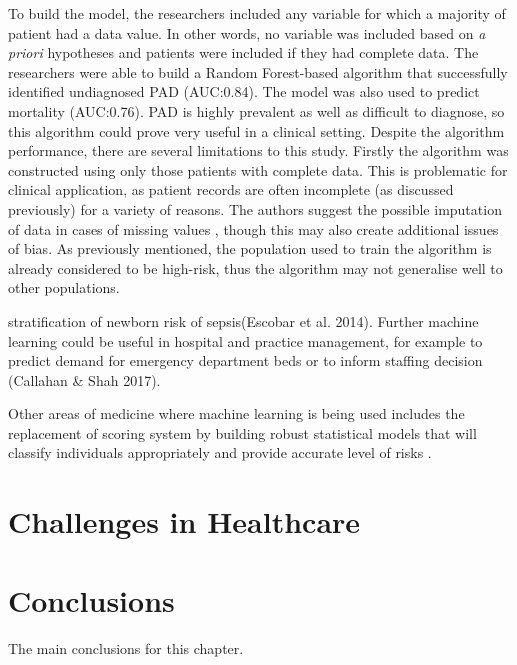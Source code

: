  To build the model, the researchers included any variable for which a majority of patient had a data value. In other words, no variable was included based on \textit{a priori} hypotheses and patients were included if they had complete data. The researchers were able to build a Random Forest-based algorithm that successfully identified undiagnosed PAD (AUC:0.84). The model was also used to predict mortality (AUC:0.76). PAD is highly prevalent as well as difficult to diagnose, so this algorithm could prove very useful in a clinical setting.\newline
 Despite the algorithm performance, there are several limitations to this study. Firstly the algorithm was constructed using only those patients with complete data. This is problematic for clinical application, as patient records are often incomplete (as discussed previously) for a variety of reasons. The authors suggest the possible imputation of data in cases of missing values \citep{Ross:2016kh}, though this may also create additional issues of bias. As previously mentioned, the population used to train the algorithm is already considered  to be high-risk, thus the algorithm may not generalise well to other populations.

 stratification of newborn risk of sepsis(Escobar et al. 2014). Further machine learning could be useful in hospital and practice management, for example to predict demand for emergency department beds or to inform staffing decision (Callahan & Shah 2017).


Other areas of medicine where machine learning is being used includes the replacement of scoring system by building robust statistical models that will classify individuals appropriately and provide accurate level of risks \citep{Callahan:2017bz, Besseling:2017bs}. 


\section{Challenges in Healthcare}



\section{Conclusions}

The main conclusions for this chapter.


